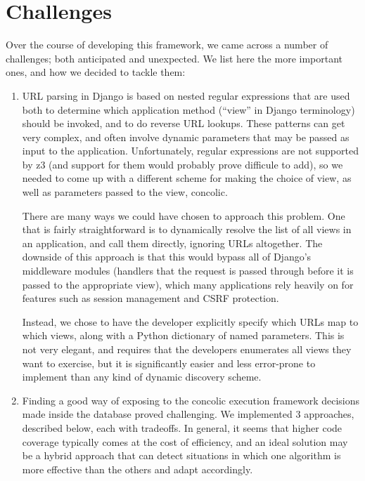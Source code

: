 \documentclass{scrartcl}
\begin{document}
\section{Challenges}
Over the course of developing this framework, we came across a number of
challenges; both anticipated and unexpected. We list here the more important
ones, and how we decided to tackle them:
\begin{enumerate}
	\item URL parsing in Django is based on nested regular expressions that
		are used both to determine which application method (``view''
		in Django terminology) should be invoked, and to do reverse URL
		lookups. These patterns can get very complex, and often involve
		dynamic parameters that may be passed as input to the
		application. Unfortunately, regular expressions are not
		supported by z3 (and support for them would probably prove
		difficule to add), so we needed to come up with a different
		scheme for making the choice of view, as well as parameters
		passed to the view, concolic.

		There are many ways we could have chosen to approach this
		problem. One that is fairly straightforward is to dynamically
		resolve the list of all views in an application, and call them
		directly, ignoring URLs altogether.  The downside of this
		approach is that this would bypass all of Django's middleware
		modules (handlers that the request is passed through before it
		is passed to the appropriate view), which many applications
		rely heavily on for features such as session management and
		CSRF protection.

		Instead, we chose to have the developer explicitly specify
		which URLs map to which views, along with a Python dictionary
		of named parameters. This is not very elegant, and requires
		that the developers enumerates all views they want to exercise,
		but it is significantly easier and less error-prone to
		implement than any kind of dynamic discovery scheme.

	\item Finding a good way of exposing to the concolic execution framework
    decisions made inside the database proved challenging. We implemented 3
    approaches, described below, each with tradeoffs. In general, it seems
    that higher code coverage typically comes at the cost of efficiency, and an
    ideal solution may be a hybrid approach that can detect situations in which
    one algorithm is more effective than the others and adapt accordingly.


\end{enumerate}
\end{document}
